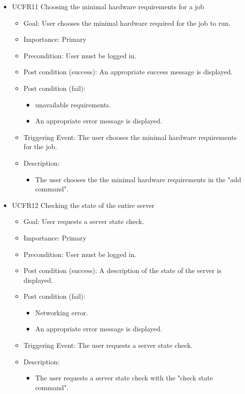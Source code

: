 \begin{itemize}
    \item  UCFR11 Choosing the minimal hardware requirements for a job
    \begin{itemize}
      \item Goal: User chooses the minimal hardware required for the job to run.
      \item Importance: Primary
      \item Precondition: User must be logged in.
      \item Post condition (success): An appropriate success message is displayed.
      \item Post condition (fail):
      \begin{itemize}
        \item unavailable requirements.
        \item An appropriate error message is displayed.
      \end{itemize}
      \item Triggering Event: The user chooses the minimal hardware requirements for the job.
      \item Description:
      \begin{itemize}
        \item The user chooses the the minimal hardware requirements in the "add command".
      \end{itemize}
    \end{itemize}

    \item  UCFR12 Checking the state of the entire server
    \begin{itemize}
      \item Goal: User requests a server state check.
      \item Importance: Primary
      \item Precondition: User must be logged in.
      \item Post condition (success): A description of the state of the server is displayed.
      \item Post condition (fail):
      \begin{itemize}
        \item Networking error.
        \item An appropriate error message is displayed.
      \end{itemize}
      \item Triggering Event: The user requests a server state check.
      \item Description:
      \begin{itemize}
        \item The user requests a server state check with the "check state command".
      \end{itemize}
    \end{itemize}



\end{itemize}
